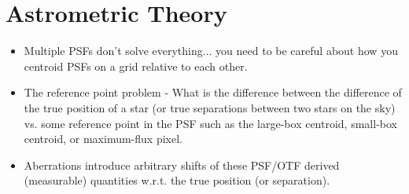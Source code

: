 \section{Astrometric Theory}
\label{sec:astrometry_theory}

\begin{itemize}
\item Multiple PSFs don't solve everything... you need to be careful about how you centroid PSFs on a grid relative to each other. 
\item The reference point problem - What is the difference between the difference of the true position of a star (or true separations between two stars on the sky) vs. some reference point in the PSF such as the large-box centroid, small-box centroid, or maximum-flux pixel. 
\item Aberrations introduce arbitrary shifts of these PSF/OTF derived (measurable) quantities w.r.t. the true position (or separation).
\end{itemize}